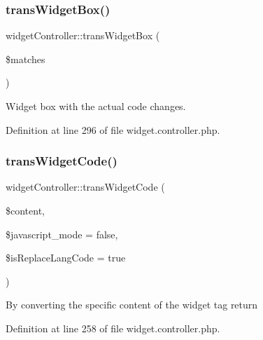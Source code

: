 \hypertarget{classwidgetController_ad406bf4681c3dc1ccf37897479218111}{}\label{classwidgetController_ad406bf4681c3dc1ccf37897479218111} 
\subsubsection{\texorpdfstring{trans\+Widget\+Box()}{transWidgetBox()}}
{\footnotesize\ttfamily widget\+Controller\+::trans\+Widget\+Box (\begin{DoxyParamCaption}\item[{}]{\$matches }\end{DoxyParamCaption})}



Widget box with the actual code changes. 



Definition at line 296 of file widget.\+controller.\+php.

\hypertarget{classwidgetController_a948e4ce023dc430a42607019bab5d878}{}\label{classwidgetController_a948e4ce023dc430a42607019bab5d878} 
\subsubsection{\texorpdfstring{trans\+Widget\+Code()}{transWidgetCode()}}
{\footnotesize\ttfamily widget\+Controller\+::trans\+Widget\+Code (\begin{DoxyParamCaption}\item[{}]{\$content,  }\item[{}]{\$javascript\+\_\+mode = {\ttfamily false},  }\item[{}]{\$is\+Replace\+Lang\+Code = {\ttfamily true} }\end{DoxyParamCaption})}

By converting the specific content of the widget tag return 

Definition at line 258 of file widget.\+controller.\+php.

\hypertarget{classwidgetController_acb8488ae3081bdfcf77dbd73740174be}{}\label{classwidgetController_acb8488ae3081bdfcf77dbd73740174be} 
